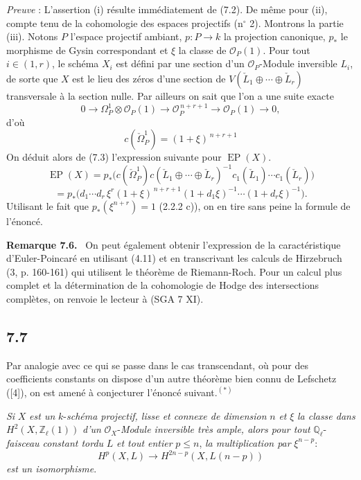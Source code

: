 \documentclass[11pt]{article}
\newenvironment{statement}[1]{\par\medskip\noindent\textbf{#1.}\ }{\par\medskip}
\begin{document}
\emph{Preuve} : L'assertion (i) résulte immédiatement de (7.2). De même pour (ii), compte tenu de la cohomologie des espaces projectifs (n$^\circ$ 2). Montrons la partie (iii). Notons $P$ l'espace projectif ambiant, $p:P\to k$ la projection canonique, $p_*$ le morphisme de Gysin 
correspondant et $\xi$ la classe de $\mathcal O_P(1)$. Pour tout $i\in(1,r)$, le schéma $X_i$ est défini par une
section d'un $\mathcal O_P$-Module inversible $L_i$, de sorte que $X$ est le lieu des zéros d'une section de $V(\check L_1\oplus\cdots\oplus\check L_r)$ transversale à la section nulle. Par ailleurs on sait que l'on a une suite exacte
\[
0\to\Omega_P^1\otimes\mathcal O_P(1)\to\mathcal O_P^{\,n+r+1}\to\mathcal O_P(1)\to0,
\]
d'où
\[
c(\check\Omega_P^1)=(1+\xi)^{\,n+r+1}
\]
On déduit alors de (7.3) l'expression suivante pour $\operatorname{EP}(X)$.
\[
\operatorname{EP}(X)
=p_*\bigl(c(\check\Omega_P^1)c(\check L_1\oplus\cdots\oplus\check L_r)^{-1}
c_1(\check L_1)\cdots c_1(\check L_r)\bigr)
\]
\[
=p_*\bigl(d_1\cdots d_r\,\xi^r(1+\xi)^{\,n+r+1}
(1+d_1\xi)^{-1}\cdots(1+d_r\xi)^{-1}\bigr).
\]
Utilisant le fait que $p_*(\xi^{n+r})=1$ (2.2.2 c)), on en tire sans peine la formule de l'énoncé.

\begin{statement}{Remarque 7.6}
On peut également obtenir l'expression de la caractéristique d'Euler-Poincaré en utilisant (4.11) et en transcrivant les calculs de Hirzebruch (3, p. 160-161) qui utilisent le théorème de Riemann-Roch. Pour un calcul plus complet et la détermination de la cohomologie de Hodge des intersections complètes, on renvoie le lecteur à (SGA 7 XI).
\end{statement}

\subsection*{7.7}

Par analogie avec ce qui se passe dans le cas transcendant, où pour des coefficients constants on dispose d'un autre théorème bien connu de Lefschetz ([4]), on est amené à conjecturer l'énoncé suivant.$^{(*)}$

 \emph{Si} $X$ \emph{est un} $k$-\emph{schéma projectif, lisse et connexe de dimension} $n$ \emph{et} $\xi$ \emph{la classe dans} $H^2(X,\mathbb Z_\ell(1))$ \emph{d'un} $\mathcal O_X$-\emph{Module inversible très ample, alors pour tout} $\mathbb Q_\ell$-\emph{faisceau constant tordu} $L$ \emph{et tout entier} $p\le n$, \emph{la multiplication par} $\xi^{n-p}$:
\[
H^p(X,L)\to H^{2n-p}(X,L(n-p))
\]
\emph{est un isomorphisme}.
\end{document}

